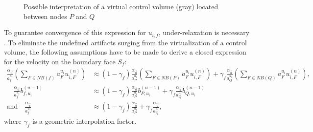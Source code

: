 \begin{figure}[h]
  
  \centering{}
  \caption{Possible interpretation of a virtual control volume (gray) located between nodes $P$ and $Q$ }
  \label{fig:virt}
\end{figure}

To guarantee convergence of this expression for \(u_{i,f}\), under-relaxation is necessary \cite{majumdar88}. To eliminate the undefined artifacts surging from the virtualization of a control volume, the following assumptions have to be made to derive a closed expression for the velocity on the boundary face \(S_f\):
\begin{subequations}
\label{eq:approxpwim}
\begin{align}
  \frac{\alpha_{\vec{u}}}{a_f^{u_i}} \left(\sum_{F \in NB(f)} a_F^{u_i} u_{i,F}^{(n)} \right)
  &\approx
  \left(1-\gamma_f\right) \frac{\alpha_{\vec{u}}}{a_P^{u_i}} \left(\sum_{F \in NB(P)} a_F^{u_i} u_{i,F}^{(n)} \right)
  +
  \gamma_f \frac{\alpha_{\vec{u}}}{a_Q^{u_i}} \left(\sum_{F \in NB(Q)} a_F^{u_i} u_{i,F}^{(n)} \right), \\[1em]
  \quad
  \frac{\alpha_{\vec{u}}}{a_f^{u_i}}b_{f,u_i}^{(n-1)} 
  &\approx
  \left(1-\gamma_f\right) \frac{\alpha_{\vec{u}}}{a_P^{u_i}} b_{P,u_i}^{(n-1)} 
  +
  \gamma_f \frac{\alpha_{\vec{u}}}{a_Q^{u_i}} b_{Q,u_i}^{(n-1)} \\[1em]
  \text{and}
  \quad
  \frac{\alpha_{\vec{u}}}{a_f^{u_i}} 
  &\approx
  \left(1-\gamma_f\right) \frac{\alpha_{\vec{u}}}{a_P^{u_i}} 
  +
  \gamma_f \frac{\alpha_{\vec{u}}}{a_Q^{u_i}},
\end{align}
\end{subequations}
where \(\gamma_f\) is a geometric interpolation factor. 

